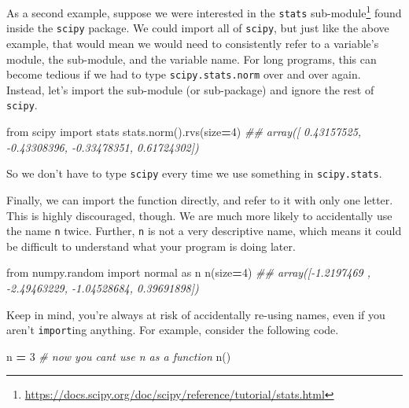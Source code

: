 \documentclass[
  12pt,
  krantz2]{krantz}
\makeatletter
\newenvironment{Shaded}{\begin{snugshade}}{\end{snugshade}}
\newcommand{\CommentTok}[1]{\textcolor[rgb]{0.37,0.37,0.37}{\textit{#1}}}
\newcommand{\DecValTok}[1]{\textcolor[rgb]{0.06,0.06,0.06}{#1}}
\newcommand{\ImportTok}[1]{#1}
\newcommand{\NormalTok}[1]{#1}
\newcommand{\OperatorTok}[1]{\textcolor[rgb]{0.43,0.43,0.43}{\textbf{#1}}}
\renewcommand{\href}[2]{#2\footnote{\url{#1}}}
\newenvironment{kframe}{%
\medskip{}
\setlength{\fboxsep}{.8em}
 \def\at@end@of@kframe{}%
 \ifinner\ifhmode%
  \def\at@end@of@kframe{\end{minipage}}%
  \begin{minipage}{\columnwidth}%
 \fi\fi%
 \def\FrameCommand##1{\hskip\@totalleftmargin \hskip-\fboxsep
 \colorbox{shadecolor}{##1}\hskip-\fboxsep
     \hskip-\linewidth \hskip-\@totalleftmargin \hskip\columnwidth}%
 \MakeFramed {\advance\hsize-\width
   \@totalleftmargin\z@ \linewidth\hsize
   \@setminipage}}%
 {\par\unskip\endMakeFramed%
 \at@end@of@kframe}
\renewenvironment{Shaded}{\begin{kframe}}{\end{kframe}}
\makeatother
\begin{document}
As a second example, suppose we were interested in the \href{https://docs.scipy.org/doc/scipy/reference/tutorial/stats.html}{\texttt{stats} sub-module} found inside the \texttt{scipy} package. We could import all of \texttt{scipy}, but just like the above example, that would mean we would need to consistently refer to a variable's module, the sub-module, and the variable name. For long programs, this can become tedious if we had to type \texttt{scipy.stats.norm} over and over again. Instead, let's import the sub-module (or sub-package) and ignore the rest of \texttt{scipy}.

\begin{Shaded}
\begin{Highlighting}[]
\ImportTok{from}\NormalTok{ scipy }\ImportTok{import}\NormalTok{ stats}
\NormalTok{stats.norm().rvs(size}\OperatorTok{=}\DecValTok{4}\NormalTok{)}
\CommentTok{\#\# array([ 0.43157525, {-}0.43308396, {-}0.33478351,  0.61724302])}
\end{Highlighting}
\end{Shaded}

So we don't have to type \texttt{scipy} every time we use something in \texttt{scipy.stats}.

Finally, we can import the function directly, and refer to it with only one letter. This is highly discouraged, though. We are much more likely to accidentally use the name \texttt{n} twice. Further, \texttt{n} is not a very descriptive name, which means it could be difficult to understand what your program is doing later.

\begin{Shaded}
\begin{Highlighting}[]
\ImportTok{from}\NormalTok{ numpy.random }\ImportTok{import}\NormalTok{ normal }\ImportTok{as}\NormalTok{ n}
\NormalTok{n(size}\OperatorTok{=}\DecValTok{4}\NormalTok{)}
\CommentTok{\#\# array([{-}1.2197469 , {-}2.49463229, {-}1.04528684,  0.39691898])}
\end{Highlighting}
\end{Shaded}

Keep in mind, you're always at risk of accidentally re-using names, even if you aren't \texttt{import}ing anything. For example, consider the following code.

\begin{Shaded}
\begin{Highlighting}[]
\NormalTok{n }\OperatorTok{=} \DecValTok{3} \CommentTok{\# now you can\textquotesingle{}t use n as a function }
\NormalTok{n()   }
\end{Highlighting}
\end{Shaded}
\end{document}

